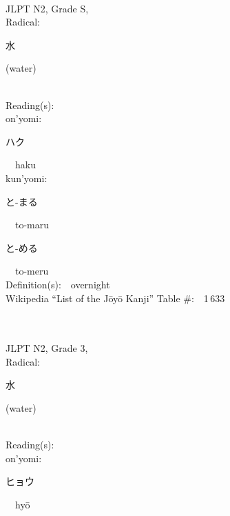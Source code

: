 \begin{multicols}{2}
{\fontsize{34pt}{40pt}  }\ \ \\  %
{JLPT N2, Grade S, \\Radical:\ \ {\begin{CJK}{UTF8}{min} 水 \end{CJK}} (water) } \\
Reading(s):\ \ \\
{\hspace*{1em}}on'yomi:\ \ \\
{\hspace*{2em}}{\begin{CJK}{UTF8}{min} ハク \end{CJK}}\ \ haku\ \ \\
{\hspace*{1em}}kun'yomi:\ \ \\
{\hspace*{2em}}{\begin{CJK}{UTF8}{min} と-まる \end{CJK}}\ \ to-maru\ \ \\
{\hspace*{2em}}{\begin{CJK}{UTF8}{min} と-める \end{CJK}}\ \ to-meru\ \ \\
Definition(s):\ \ overnight \\
Wikipedia ``List of the J\=oy\=o Kanji'' Table \#:\ \ 1\,633 \\
\ \ \\
{\fontsize{34pt}{40pt}  }\ \ \\  %
{JLPT N2, Grade 3, \\Radical:\ \ {\begin{CJK}{UTF8}{min} 水 \end{CJK}} (water) } \\
Reading(s):\ \ \\
{\hspace*{1em}}on'yomi:\ \ \\
{\hspace*{2em}}{\begin{CJK}{UTF8}{min} ヒョウ \end{CJK}}\ \ hy\=o\ \ \\

\end{multicols}
